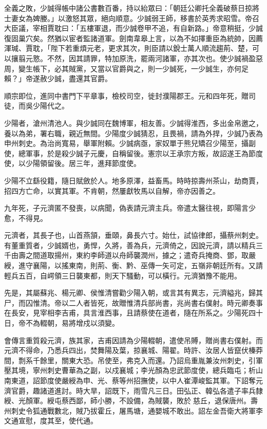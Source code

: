 \begin{pinyinscope}
 全義之敗，少誠得帳中諸公書數百番，持以紿眾曰：「朝廷公卿托全義破蔡日掠將士妻女為婢媵。」以激怒其眾，絕向順意。少誠弱王師，移書於英秀求昭雪。帝召大臣議，宰相賈耽曰：「五樓軍退，而少誠卷甲不追，有自新路。」帝意稍挺，少誠復固巢穴矣。然猶以宦者監諸道軍。劍南韋皋上言，以為不如擇重臣為統帥，因薦渾瑊、賈耽，「陛下若重煩元老，更求其次，則臣請以銳士萬人順流趨荊、楚，可以攘翦元憝。不然，因其請罪，特加原洗，罷兩河諸軍，亦其次也。使少誠禍盈惡周，變生帳下，必其賊黨，又當以官爵與之，則一少誠死，一少誠生，亦何足賴？」帝遂赦少誠，盡還其官爵。



 順宗即位，進同中書門下平章事，檢校司空，徙封濮陽郡王。元和四年死，贈司徒，而吳少陽代之。



 少陽者，滄州清池人。與少誠同在魏博軍，相友善。少誠得淮西，多出金帛邀之，養以為弟，署右職，親近無間。少陽度少誠猜忍，且畏禍，請為外捍，少誠乃表為申州刺史。為治尚寬易，舉軍附賴。少誠病亟，家奴單于熊兒矯召少陽至，攝副使，總軍事，於是殺少誠子元慶，自稱留後。憲宗以王承宗方叛，故詔遂王為節度使，以少陽領留後。居三年，進拜節度使。



 少陽不立繇役籍，隨日賦斂於人。地多原澤，益畜馬。時時掠壽州茶山，劫商賈，招四方亡命，以實其軍。不肯朝，然屢獻牧馬以自解，帝亦因善之。



 九年死，子元濟匿不發喪，以病聞，偽表請元濟主兵。帝遣太醫往視，即陽言少愈，不得見。



 元濟者，其長子也，山首燕頷，垂頤，鼻長六寸。始仕，試協律郎，攝蔡州刺史。有董重質者，少誠婿也，勇悍，久將，善為兵，元濟倚之，因說元濟，請以精兵三千由壽之間道取揚州，東約李師道以舟師襲潤州，據之；遣奇兵掩商、鄧，取嚴綬，進守襄陽，以搖東南，則荊、衡、黔、巫傳一矢可定，五嶺非朝廷所有。又請輕兵五百，自崿領三日襲東都，則天下騷動，可以橫行。元濟猶豫不能用。



 先是，其屬蘇兆、楊元卿、侯惟清嘗勸少陽入朝，或言其有異志，元濟縊兆，歸其尸，而囚惟清。帝以二人者皆死，故贈惟清兵部尚書，兆尚書右僕射。時元卿奏事在長安，見宰相李吉甫，具言淮西事，且請蔡使在道者，隨在所系之。少陽死四十日，帝不為輟朝，易將增戍以須變。



 會傳言重質殺元濟，族其家，吉甫因請為少陽輟朝，遣使吊賻，贈尚書右僕射。而元濟不得命，乃悉兵四出，焚舞陽及葉，掠襄城、陽翟。時許、汝居人皆竄伏榛莽間，剽系千餘里，關東大恐。吊使至，弗克入而還。乃詔烏重胤兼汝州刺史，引軍壓其境，寧州刺史曹華為之副，以戍襄城；李光顏為忠武節度使，總兵臨屯；析山南東道，詔節度使嚴綬為申、光、蔡等州招撫使，以中人崔潭峻監其軍。下詔奪元濟官爵，趣諸道進討。時大旱，詔既下，雨雪凡三日。田弘正、韓弘各遣子率兵隸綬、光顏軍。綬屯蔡西鄙，師小勝，不設備，為賊襲，敗於慈丘，退保唐州。壽州刺史令狐通戰數北，賊乃拔霍丘，屠馬塘，通嬰城不敢出。詔左金吾衛大將軍李文通宣慰，度其至，使代通。




\end{pinyinscope}
